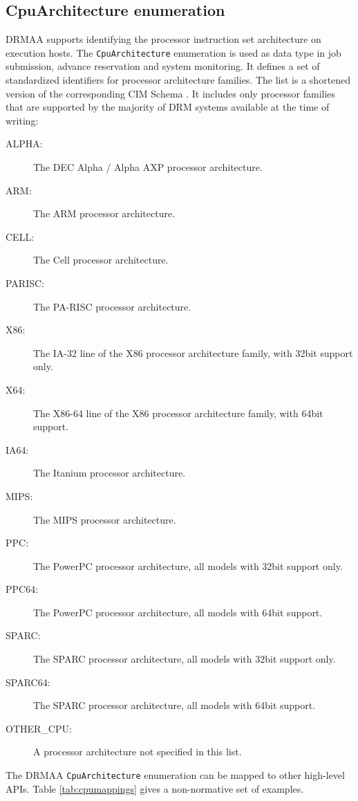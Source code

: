 \documentclass{article}
\newcommand{\h}[1]{\lstinline|#1|}
\begin{document}
\subsection{CpuArchitecture enumeration}
\label{sec:cpuarchs}

DRMAA supports identifying the processor instruction set architecture on execution hosts. The \h{CpuArchitecture} enumeration is used as data type in job submission, advance reservation and system monitoring. It defines a set of standardized identifiers for processor architecture families. The list is a shortened version of the corresponding CIM Schema \cite{cim}. It includes only processor families that are supported by the majority of DRM systems available at the time of writing:



\begin{description}
\item[ALPHA:] The DEC Alpha / Alpha AXP processor architecture.
\item[ARM:] The ARM processor architecture.
\item[CELL:] The Cell processor architecture.
\item[PARISC:] The PA-RISC processor architecture.
\item[X86:] The IA-32 line of the X86 processor architecture family, with 32bit support only.
\item[X64:] The X86-64 line of the X86 processor architecture family, with 64bit support.
\item[IA64:] The Itanium processor architecture.
\item[MIPS:] The MIPS processor architecture.
\item[PPC:] The PowerPC processor architecture, all models with 32bit support only.
\item[PPC64:] The PowerPC processor architecture, all models with 64bit support.
\item[SPARC:] The SPARC processor architecture, all models with 32bit support only.
\item[SPARC64:] The SPARC processor architecture, all models with 64bit support.
\item[OTHER\_CPU:] A processor architecture not specified in this list.
\end{description}

The DRMAA \h{CpuArchitecture} enumeration can be mapped to other high-level APIs. Table \ref{tab:cpumappings} gives a non-normative set of examples.
\end{document}
